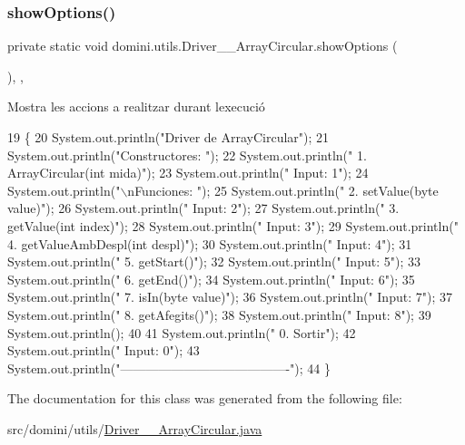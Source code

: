 \subsubsection{\texorpdfstring{show\+Options()}{showOptions()}}
{\footnotesize\ttfamily private static void domini.\+utils.\+Driver\+\_\+\+\_\+\+Array\+Circular.\+show\+Options (\begin{DoxyParamCaption}{ }\end{DoxyParamCaption})\hspace{0.3cm}{\ttfamily [inline]}, {\ttfamily [static]}, {\ttfamily [private]}}



Mostra les accions a realitzar durant l\textquotesingle{}execució 


\begin{DoxyCode}
19                                      \{
20         System.out.println(\textcolor{stringliteral}{"Driver de ArrayCircular"});
21         System.out.println(\textcolor{stringliteral}{"Constructores: "});
22         System.out.println(\textcolor{stringliteral}{"     1. ArrayCircular(int mida)"});
23         System.out.println(\textcolor{stringliteral}{"     Input: 1"});
24         System.out.println(\textcolor{stringliteral}{"\(\backslash\)nFunciones: "});
25         System.out.println(\textcolor{stringliteral}{"     2. setValue(byte value)"});
26         System.out.println(\textcolor{stringliteral}{"     Input: 2"});
27         System.out.println(\textcolor{stringliteral}{"     3. getValue(int index)"});
28         System.out.println(\textcolor{stringliteral}{"     Input: 3"});
29         System.out.println(\textcolor{stringliteral}{"     4. getValueAmbDespl(int despl)"});
30         System.out.println(\textcolor{stringliteral}{"     Input: 4"});
31         System.out.println(\textcolor{stringliteral}{"     5. getStart()"});
32         System.out.println(\textcolor{stringliteral}{"     Input: 5"});
33         System.out.println(\textcolor{stringliteral}{"     6. getEnd()"});
34         System.out.println(\textcolor{stringliteral}{"     Input: 6"});
35         System.out.println(\textcolor{stringliteral}{"     7. isIn(byte value)"});
36         System.out.println(\textcolor{stringliteral}{"     Input: 7"});
37         System.out.println(\textcolor{stringliteral}{"     8. getAfegits()"});
38         System.out.println(\textcolor{stringliteral}{"     Input: 8"});
39         System.out.println();
40 
41         System.out.println(\textcolor{stringliteral}{"     0. Sortir"});
42         System.out.println(\textcolor{stringliteral}{"     Input: 0"});
43         System.out.println(\textcolor{stringliteral}{"----------------------------------------"});
44     \}
\end{DoxyCode}


The documentation for this class was generated from the following file\+:\begin{DoxyCompactItemize}
\item 
src/domini/utils/\hyperlink{Driver____ArrayCircular_8java}{Driver\+\_\+\+\_\+\+Array\+Circular.\+java}\end{DoxyCompactItemize}
